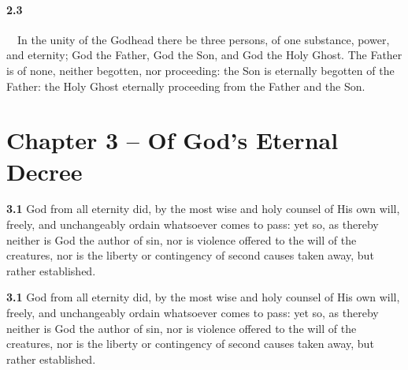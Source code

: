 \paragraph{2.3}\ \ In the unity of the Godhead there be three persons, of one substance, power, and eternity; God the Father, God the Son, and God the Holy Ghost. The Father is of none, neither begotten, nor proceeding: the Son is eternally begotten of the Father: the Holy Ghost eternally proceeding from the Father and the Son.   
\bigskip

\setcounter{footnote}{0} 
\setcounter{mgncount}{0}
\section{Chapter 3 -- Of God's Eternal Decree} 

\par\textbf{3.1} God from all eternity did, by the most wise and holy counsel of His own will, freely, and unchangeably ordain whatsoever comes to pass: yet so, as thereby neither is God the author of sin, nor is violence offered to the will of the creatures, nor is the liberty or contingency of second causes taken away, but rather established.   


\par\textbf{3.1} God from all eternity did, by the most wise and holy counsel of His own will, freely, and unchangeably ordain whatsoever comes to pass: yet so, as thereby neither is God the author of sin, nor is violence offered to the will of the creatures, nor is the liberty or contingency of second causes taken away, but rather established.   



